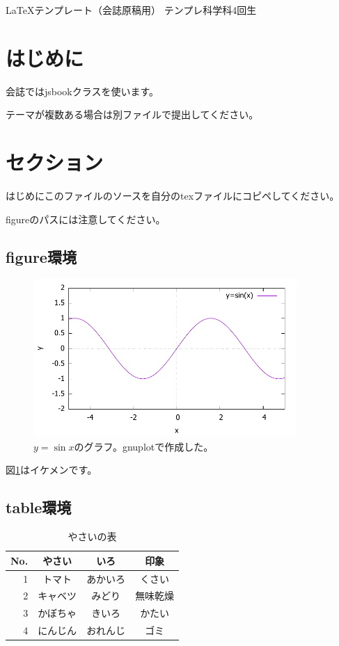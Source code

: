 \documentclass[10pt,b5paper,papersize,dvipdfmx]{jsbook}
\begin{document}


\kaishititle%
  {\LaTeX テンプレート（会誌原稿用）}%
  {テンプレ科学科4回生}%
  {}%

%
\section*{はじめに}
会誌ではjsbookクラスを使います。\par
テーマが複数ある場合は別ファイルで提出してください。

%
\section{セクション}
はじめにこのファイルのソースを自分のtexファイルにコピペしてください。\par
figureのパスには注意してください。


\clearpage
%
\subsection{figure環境}

\begin{figure}[htbp]
  \centering
  \includegraphics[height=6cm]{temp/fig-sin.pdf}
  \caption{$y=\sin x$のグラフ。gnuplotで作成した。}
  \label{fig:sin}
\end{figure}

図\ref{fig:sin}はイケメンです。

%
\subsection{table環境}

\begin{table}[htbp]
  \centering
  \caption{やさいの表}
  \label{tbl:vegetable}
  \begin{tabular}{r|ccc} \hline
    No. & やさい & いろ & 印象 \\ \hline
    1 & トマト & あかいろ & くさい \\
    2 & キャベツ & みどり & 無味乾燥 \\
    3 & かぼちゃ & きいろ & かたい \\
    4 & にんじん & おれんじ & ゴミ \\ \hline
  \end{tabular}
\end{table}
\end{document}
